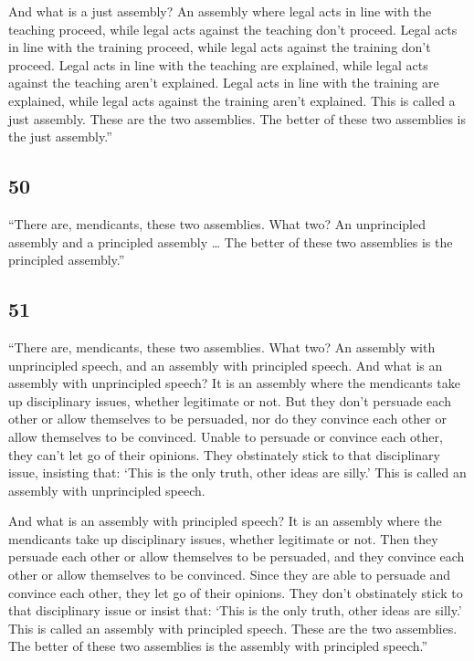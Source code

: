 \documentclass[12pt,openany]{book}%
\begin{document}
And what is a just assembly? An assembly where legal acts in line with the teaching proceed, while legal acts against the teaching don’t proceed. Legal acts in line with the training proceed, while legal acts against the training don’t proceed. Legal acts in line with the teaching are explained, while legal acts against the teaching aren’t explained. Legal acts in line with the training are explained, while legal acts against the training aren’t explained. This is called a just assembly. These are the two assemblies. The better of these two assemblies is the just assembly.” 

\subsection*{50 }

“There are, mendicants, these two assemblies. What two? An unprincipled assembly and a principled assembly … The better of these two assemblies is the principled assembly.” 

\subsection*{51 }

“There are, mendicants, these two assemblies. What two? An assembly with unprincipled speech, and an assembly with principled speech. And what is an assembly with unprincipled speech? It is an assembly where the mendicants take up disciplinary issues, whether legitimate or not. But they don’t persuade each other or allow themselves to be persuaded, nor do they convince each other or allow themselves to be convinced. Unable to persuade or convince each other, they can’t let go of their opinions. They obstinately stick to that disciplinary issue, insisting that: ‘This is the only truth, other ideas are silly.’ This is called an assembly with unprincipled speech. 

And what is an assembly with principled speech? It is an assembly where the mendicants take up disciplinary issues, whether legitimate or not. Then they persuade each other or allow themselves to be persuaded, and they convince each other or allow themselves to be convinced. Since they are able to persuade and convince each other, they let go of their opinions. They don’t obstinately stick to that disciplinary issue or insist that: ‘This is the only truth, other ideas are silly.’ This is called an assembly with principled speech. These are the two assemblies. The better of these two assemblies is the assembly with principled speech.” 
\end{document}
